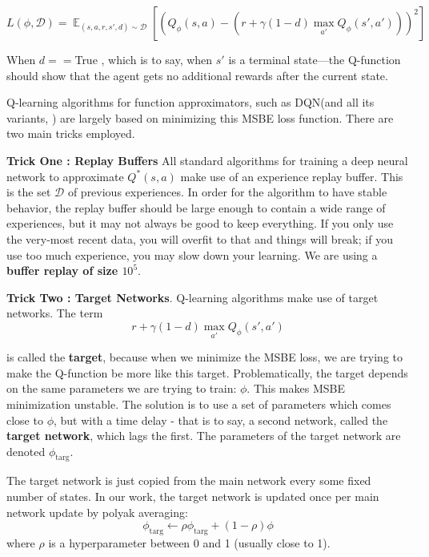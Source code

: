 $$ L (\phi , \mathcal D) = \mathop{\mathbb{E}}_{(s,a,r,s',d) \sim \mathcal D} \left[ \left(Q_{\phi}(s,a) - (r + \gamma(1 - d)\mathop{\max}_{a'} Q_{\phi}(s',a') )\right) ^2 \right] $$ 

When $d==$True , which is to say, when $s'$ is a terminal state—the Q-function should show that the 
agent gets no additional rewards after the current state. 

\vspace{\baselineskip}
Q-learning algorithms for function approximators, such as DQN(and all its variants\cite{ARTICLE:5}, \cite{ARTICLE:6}) are largely based
on minimizing this MSBE loss function. There are two main tricks employed.

\vspace{2.0cm}
\textbf{Trick One : Replay Buffers}
All standard algorithms for training a deep neural network to 
approximate $Q^*(s,a)$ make use of an experience replay buffer. 
This is the set ${\mathcal D}$ of previous experiences. 
In order for the algorithm to have stable behavior, the replay buffer should be large enough to 
contain a wide range of experiences, but it may not always be good to keep everything. 
If you only use the very-most recent data, you will overfit to that and things will break; 
if you use too much experience, you may slow down your learning. We are using a \textbf{buffer replay of size $10^5$}.

\vspace{\baselineskip}
\textbf{Trick Two : Target Networks}. Q-learning algorithms make use of target networks. The term 
$$ r + \gamma(1-d)\mathop{\max}_{a'}Q_{\phi}(s',a')$$

is called the \textbf{target}, because when we minimize the MSBE loss,
 we are trying to make the Q-function be more like this target. 
 Problematically, the target depends on the same parameters we are trying to train: $\phi$. 
 This makes MSBE minimization unstable. The solution is to use a set of parameters which comes close
  to $\phi$, but with a time delay - that is to say, a second network, called the \textbf{target network},
   which lags the first. The parameters of the target network are denoted $\phi_{\text{targ}}$.

\vspace{\baselineskip}
The target network is just copied from the main network every some fixed number of states. In our work,
the target network is updated once per main network update by polyak averaging:
$$ \phi_{\text{targ}} \leftarrow \rho \phi_{\text{targ}} + (1 - \rho)\phi$$
where $\rho$ is a hyperparameter between 0 and 1 (usually close to 1).
\vspace{10cm}
